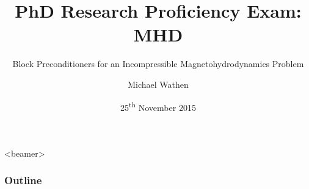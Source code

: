 \documentclass[12pt]{beamer}
\author[]{%
  Michael Wathen\\
  }
\title[]{PhD Research Proficiency Exam:
}
\subtitle{Block Preconditioners for an Incompressible Magnetohydrodynamics Problem}
\date[]{25\textsuperscript{th} November 2015 }
\institute[]{University of British Columbia}
\begin{document}
\begin{frame}
  \titlepage
\end{frame}



\title{MHD}







  \begin{frame}<beamer>
    \frametitle{Outline}
    \tableofcontents
  \end{frame}
\end{document}
